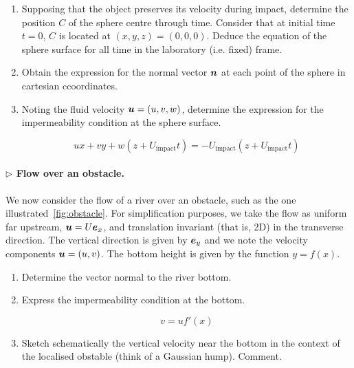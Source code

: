 \documentclass[11pt,a4paper]{article}
\newcommand{\bn}{\matrixsym{n}}
\newcommand{\be}{\matrixsym e}
\newcommand{\bu}{\matrixsym u}
\newcommand{\prg}[1]{\paragraph{$\rhd$ #1}}
\begin{document}
\begin{enumerate}
\item Supposing that the object preserves its velocity during impact, determine the position $C$ of the sphere centre through time. Consider that at initial time $t=0$, $C$ is located at $(x,y,z)=(0,0,0)$. Deduce the equation of the sphere surface for all time in the laboratory (i.e. fixed) frame.
\item Obtain the expression for the normal vector $\bn$ at each point of the sphere in cartesian ccoordinates.
\item Noting the fluid velocity $\bu=(u,v,w)$, determine the expression for the impermeability condition at the sphere surface.
\begin{answer}
\begin{equation*}
ux+vy+w(z+U_\text{impact}t) = -U_\text{impact}(z+U_\text{impact}t)
\end{equation*}
\end{answer}

\end{enumerate}
\prg{Flow over an obstacle.} We now consider the flow of a river over an obstacle, such as the one illustrated~\ref{fig:obstacle}. For simplification purposes, we take the flow as uniform far upstream, $\bu = U \be_x$, and translation invariant (that is, 2D) in the transverse direction. The vertical direction is given by $\be_y$ and we note the velocity components $\bu=(u,v)$. The bottom height is given by the function $y = f(x)$. 
\begin{enumerate}[resume]
\item Determine the vector normal to the river bottom.
\item Express the impermeability condition at the bottom.
\begin{answer}
\begin{equation*}
v = u f'(x)
\end{equation*}
\end{answer}

\item Sketch schematically the vertical velocity near the bottom in the context of the localised obstable (think of a Gaussian hump). Comment.
\end{enumerate}
\end{document}
